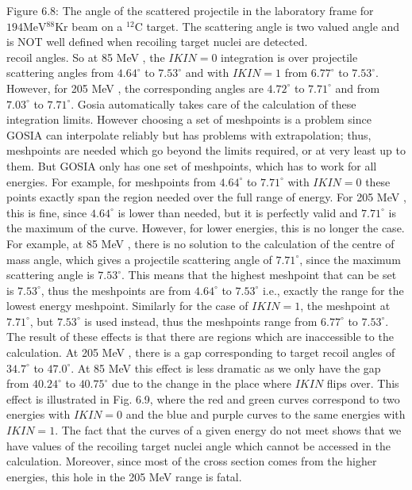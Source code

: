 \documentclass[10pt]{article}
\begin{document}
Figure 6.8: The angle of the scattered projectile in the laboratory frame for $194 \mathrm{MeV}{ }^{88} \mathrm{Kr}$ beam on a ${ }^{12} \mathrm{C}$ target. The scattering angle is two valued angle and is NOT well defined when recoiling target nuclei are detected.\\
recoil angles. So at 85 MeV , the $I K I N=0$ integration is over projectile scattering angles from $4.64^{\circ}$ to $7.53^{\circ}$ and with $I K I N=1$ from $6.77^{\circ}$ to $7.53^{\circ}$. However, for 205 MeV , the corresponding angles are $4.72^{\circ}$ to $7.71^{\circ}$ and from $7.03^{\circ}$ to $7.71^{\circ}$. Gosia automatically takes care of the calculation of these integration limits. However choosing a set of meshpoints is a problem since GOSIA can interpolate reliably but has problems with extrapolation; thus, meshpoints are needed which go beyond the limits required, or at very least up to them. But GOSIA only has one set of meshpoints, which has to work for all energies. For example, for meshpoints from $4.64^{\circ}$ to $7.71^{\circ}$ with $I K I N=0$ these points exactly span the region needed over the full range of energy. For 205 MeV , this is fine, since $4.64^{\circ}$ is lower than needed, but it is perfectly valid and $7.71^{\circ}$ is the maximum of the curve. However, for lower energies, this is no longer the case. For example, at 85 MeV , there is no solution to the calculation of the centre of mass angle, which gives a projectile scattering angle of $7.71^{\circ}$, since the maximum scattering angle is $7.53^{\circ}$. This means that the highest meshpoint that can be set is $7.53^{\circ}$, thus the meshpoints are from $4.64^{\circ}$ to $7.53^{\circ}$ i.e., exactly the range for the lowest energy meshpoint. Similarly for the case of $I K I N=1$, the meshpoint at $7.71^{\circ}$, but $7.53^{\circ}$ is used instead, thus the meshpoints range from $6.77^{\circ}$ to $7.53^{\circ}$. The result of these effects is that there are regions which are inaccessible to the calculation. At 205 MeV , there is a gap corresponding to target recoil angles of $34.7^{\circ}$ to $47.0^{\circ}$. At 85 MeV this effect is less dramatic as we only have the gap from $40.24^{\circ}$ to $40.75^{\circ}$ due to the change in the place where $I K I N$ flips over. This effect is illustrated in Fig. 6.9, where the red and green curves correspond to two energies with $I K I N=0$ and the blue and purple curves to the same energies with $I K I N=1$. The fact that the curves of a given energy do not meet shows that we have values of the recoiling target nuclei angle which cannot be accessed in the calculation. Moreover, since most of the cross section comes from the higher energies, this hole in the 205 MeV range is fatal.
\end{document}
